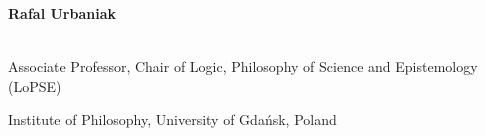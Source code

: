 \documentclass[10pt, a4paper]{article}
\begin{document}


























{\sc


\Large \textbf{Rafal Urbaniak}}\\[-5mm]




 \vspace{1mm}
  Associate Professor, Chair of Logic, Philosophy of Science and Epistemology (LoPSE)

   Institute of Philosophy, University of Gda\' nsk, Poland
\end{document}
